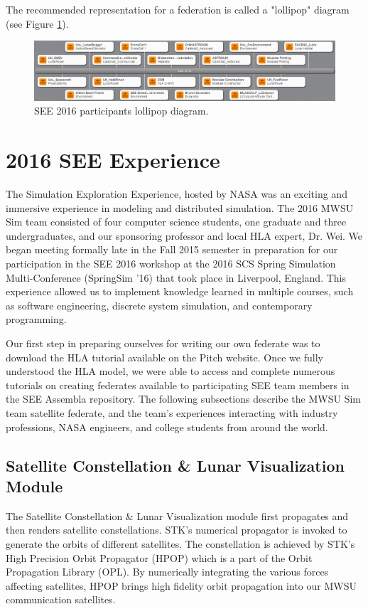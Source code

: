 \documentclass[journal, onecolumn]{IEEEtran}
\begin{document}
The recommended representation for a federation is called a "lollipop" diagram (see Figure \ref{lollipop}). 
\begin{figure}[!htbp]
	\centering
		\includegraphics[width=\linewidth]{lollipop.png}
		\caption{SEE 2016 participants lollipop diagram.}
	\label{lollipop}
\end{figure}		
\section{2016 SEE Experience}
The Simulation Exploration Experience, hosted by NASA was an exciting and immersive experience in modeling and distributed simulation.  The 2016 MWSU Sim team consisted of four computer science students, one graduate and three undergraduates, and our sponsoring professor and local HLA expert, Dr. Wei.  We began meeting formally late in the Fall 2015 semester in preparation for our participation in the SEE 2016 workshop at the 2016 SCS Spring Simulation Multi-Conference (SpringSim '16) that took place in Liverpool, England.  This experience allowed us to implement knowledge learned in multiple courses, such as software engineering, discrete system simulation, and contemporary programming.

Our first step in preparing ourselves for writing our own federate was to download the HLA tutorial available on the Pitch website\cite{HLA}.  Once we fully understood the HLA model, we were able to access and complete numerous tutorials on creating federates available to participating SEE team members in the SEE Assembla repository. The following subsections describe the MWSU Sim team satellite federate, and the team's experiences interacting with industry professions, NASA engineers, and college students from around the world.

\subsection{Satellite Constellation \& Lunar Visualization Module}
The Satellite Constellation \& Lunar Visualization module first propagates and then renders satellite constellations. STK\rq{}s numerical propagator is invoked to generate the orbits of different satellites. The constellation is achieved by STK\rq{}s High Precision Orbit Propagator (HPOP) which is a part of the Orbit Propagation Library (OPL). By numerically integrating the various forces affecting satellites, HPOP brings high fidelity orbit propagation into our MWSU communication satellites.
\end{document}
